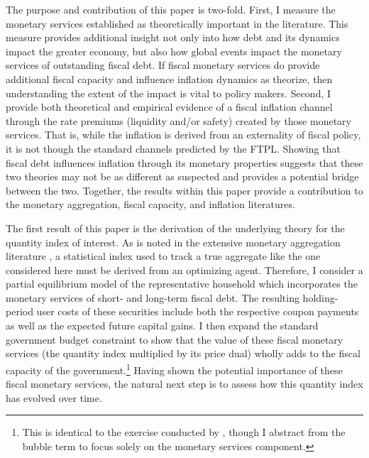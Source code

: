 \documentclass[11pt,a4paper,margin=1.5in]{article}
\begin{document}
The purpose and contribution of this paper is two-fold.
First, I measure the monetary services established as theoretically important in the literature.
This measure provides additional insight not only into how debt and its dynamics impact the greater economy, but also how global events impact the monetary services of outstanding fiscal debt.
If fiscal monetary services do provide additional fiscal capacity and influence inflation dynamics as \citet{Brunnermeier-Merkel-Sannikov:2022} theorize, then understanding the extent of the impact is vital to policy makers. 
Second, I provide both theoretical and empirical evidence of a fiscal inflation channel through the rate premiums (liquidity and/or safety) created by those monetary services.
That is, while the inflation is derived from an externality of fiscal policy, it is not though the standard channels predicted by the FTPL. 
Showing that fiscal debt influences inflation through its monetary properties suggests that these two theories may not be as different as suspected and provides a potential bridge between the two.
Together, the results within this paper provide a contribution to the monetary aggregation, fiscal capacity, and inflation literatures.

The first result of this paper is the derivation of the underlying theory for the quantity index of interest.
As is noted in the extensive monetary aggregation literature \citep[e.g.][]{Barnett:1978, Barnett:1980, Barnett-Serletis:2000}, a statistical index used to track a true aggregate like the one considered here must be derived from an optimizing agent.
Therefore, I consider a partial equilibrium model of the representative household which incorporates the monetary services of short- and long-term fiscal debt.
The resulting holding-period user costs of these securities include both the respective coupon payments as well as the expected future capital gains.
I then expand the standard government budget constraint to show that the value of these fiscal monetary services (the quantity index multiplied by its price dual) wholly adds to the fiscal capacity of the government.\footnote{
	This is identical to the exercise conducted by \citet{Brunnermeier-Merkel-Sannikov:2020}, though I abstract from the bubble term to focus solely on the monetary services component.}
Having shown the potential importance of these fiscal monetary services, the natural next step is to assess how this quantity index has evolved over time.
\end{document}
